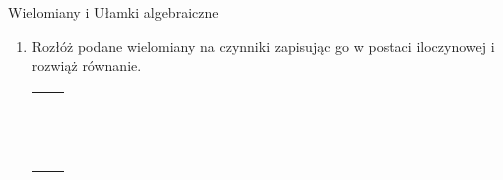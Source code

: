\documentclass[12pt,a4paper]{article}
\begin{document}
	\begin{center}
		\LARGE Wielomiany i Ułamki algebraiczne
	\end{center}
	\vspace{1cm}
	
	
	\begin{enumerate}[1.]
		\item Rozłóż podane wielomiany na czynniki zapisując go w postaci iloczynowej i rozwiąż równanie.
		
		\begin{enumerate}[a)] \begin{tabular}{p{7cm} p{7cm}} 
				\item $4x^2-2x^4+6x^3=0 $& \vspace{0.4cm} \item $9x^2-16=0 $ \\
				\item $6x^3-12x^2+18x=0 $& \item $9x^2-30x+25=0 $ \\
				\item $x^4-10x^2+25 $& \item $7x^3+2x^2-21x-6=0 $ \\
				\item $ x^3+4x^2-2x-8=0$& \item $2x^5+3x^4-2x-3=0 $ \\
				\item $x^6-7x^3-8=0 $& \item $8x^5-32x^3-x^2+4=0 $ \\
				\item $19x^3+9x^2-18x-9=0 $& \item $x^3+4x^2+x-6=0 $ \\
				\item $x^3+7x^2+4x-12=0 $& \item $x^3-x+6=0 $ \\
				\item $x^4+3x^3-15x^2-19x+30=0 $& \item $4x^4-12x^3+25x^2-48x+36=0 $ \\
				\item $x^3+4x^2-2x-8=0 $& \item $x^3-9x^2+23x-15=0 $ \\
				\item $x^3+12x^2+44x+48=0 $& \item $x^3+9x^2+23x+15=0 $ \\
				\item $x^7-17x^6+16x^5=0 $& \item $x^8+x^4-2=0 $ \\
				\item $10x^3-3x^2-2x+1=0 $& \item $4x^3+2x^2-8x+3=0 $ \\
				\item $x^5+4x^3-x^2-4=0 $& \item $2x^6-8x^4-2x^2+8=0 $ \\
		\end{tabular} \end{enumerate}
	\end{enumerate}
\end{document}
